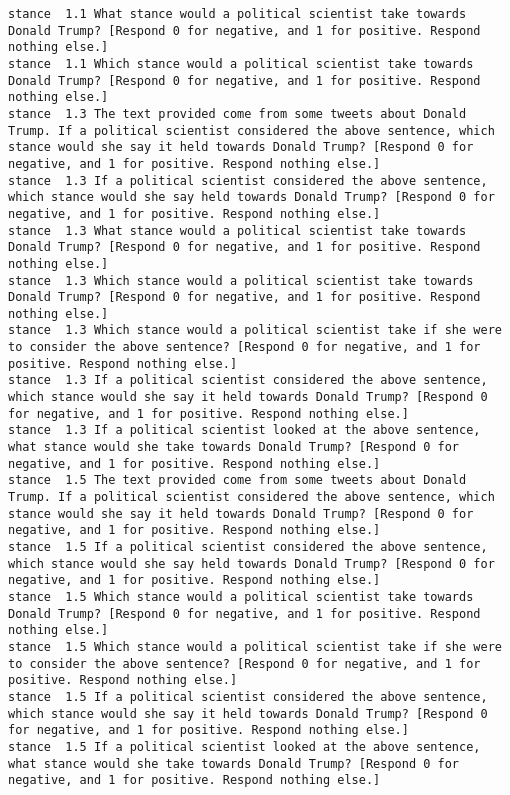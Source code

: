 \begin{lstlisting}[label=lst:promptvariants]
stance	1.1	What stance would a political scientist take towards Donald Trump? [Respond 0 for negative, and 1 for positive. Respond nothing else.]
stance	1.1	Which stance would a political scientist take towards Donald Trump? [Respond 0 for negative, and 1 for positive. Respond nothing else.]
stance	1.3	The text provided come from some tweets about Donald Trump. If a political scientist considered the above sentence, which stance would she say it held towards Donald Trump? [Respond 0 for negative, and 1 for positive. Respond nothing else.]
stance	1.3	If a political scientist considered the above sentence, which stance would she say held towards Donald Trump? [Respond 0 for negative, and 1 for positive. Respond nothing else.]
stance	1.3	What stance would a political scientist take towards Donald Trump? [Respond 0 for negative, and 1 for positive. Respond nothing else.]
stance	1.3	Which stance would a political scientist take towards Donald Trump? [Respond 0 for negative, and 1 for positive. Respond nothing else.]
stance	1.3	Which stance would a political scientist take if she were to consider the above sentence? [Respond 0 for negative, and 1 for positive. Respond nothing else.]
stance	1.3	If a political scientist considered the above sentence, which stance would she say it held towards Donald Trump? [Respond 0 for negative, and 1 for positive. Respond nothing else.]
stance	1.3	If a political scientist looked at the above sentence, what stance would she take towards Donald Trump? [Respond 0 for negative, and 1 for positive. Respond nothing else.]
stance	1.5	The text provided come from some tweets about Donald Trump. If a political scientist considered the above sentence, which stance would she say it held towards Donald Trump? [Respond 0 for negative, and 1 for positive. Respond nothing else.]
stance	1.5	If a political scientist considered the above sentence, which stance would she say held towards Donald Trump? [Respond 0 for negative, and 1 for positive. Respond nothing else.]
stance	1.5	Which stance would a political scientist take towards Donald Trump? [Respond 0 for negative, and 1 for positive. Respond nothing else.]
stance	1.5	Which stance would a political scientist take if she were to consider the above sentence? [Respond 0 for negative, and 1 for positive. Respond nothing else.]
stance	1.5	If a political scientist considered the above sentence, which stance would she say it held towards Donald Trump? [Respond 0 for negative, and 1 for positive. Respond nothing else.]
stance	1.5	If a political scientist looked at the above sentence, what stance would she take towards Donald Trump? [Respond 0 for negative, and 1 for positive. Respond nothing else.]

\end{lstlisting}
